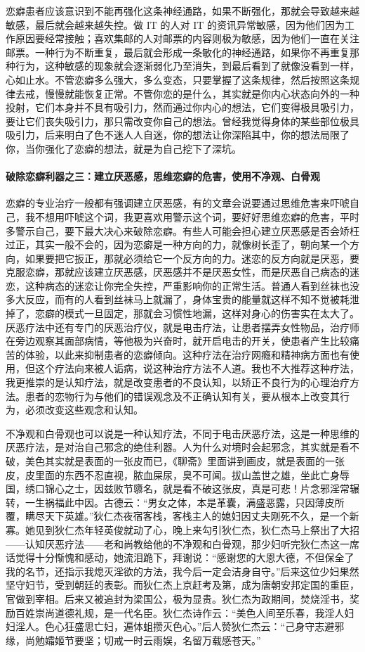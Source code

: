 恋癖患者应该意识到不能再强化这条神经通路，如果不断强化，那就会导致越来越敏感，最后就会越来越失控。做 IT 的人对 IT 的资讯异常敏感，因为他们因为工作原因要经常接触；喜欢集邮的人对邮票的内容则极为敏感，因为他们一直在关注邮票。一种行为不断重复，最后就会形成一条敏化的神经通路，如果你不再重复那种行为，这种敏感的现象就会逐渐弱化乃至消失，到最后看到了就像没看到一样，心如止水。不管恋癖多么强大，多么变态，只要掌握了这条规律，然后按照这条规律去戒，慢慢就能恢复正常。不管你恋的是什么，其实就是你内心状态向外的一种投射，它们本身并不具有吸引力，然而通过你内心的想法，它们变得极具吸引力，要让它们丧失吸引力，那只需改变你自己的想法。曾经我觉得身体的某些部位极具吸引力，后来明白了色不迷人人自迷，你的想法让你深陷其中，你的想法局限了你，当你强化了恋癖的想法，就是为自己挖下了深坑。

\paragraph{破除恋癖利器之三：建立厌恶感，思维恋癖的危害，使用不净观、白骨观}

恋癖的专业治疗一般都有强调建立厌恶感，有的文章会说要通过思维危害来吓唬自己，我不想用吓唬这个词，我更喜欢用警示这个词，要好好思维恋癖的危害，平时多警示自己，要下最大决心来破除恋癖。有些人可能会担心建立厌恶感是否会矫枉过正，其实一般不会的，因为恋癖是一种方向的力，就像树长歪了，朝向某一个方向，如果要把它扳正，那就必须给它一个反方向的力。迷恋的反方向就是厌恶，要克服恋癖，那就应该建立厌恶感，厌恶感并不是厌恶女性，而是厌恶自己病态的迷恋，这种病态的迷恋让你完全失控，严重影响你的正常生活。普通人看到丝袜也没多大反应，而有的人看到丝袜马上就漏了，身体宝贵的能量就这样不知不觉被耗泄掉了，恋癖的模式一旦固定，那就会习惯性地漏，这样对身心的伤害实在太大了。厌恶疗法中还有专门的厌恶治疗仪，就是电击疗法，让患者摆弄女性物品，治疗师在旁边观察其面部病情，等他极为兴奋时，就开启电击的开关，使患者产生比较痛苦的体验，以此来抑制患者的恋癖倾向。这种疗法在治疗网瘾和精神病方面也有使用，但这个疗法向来被人诟病，说这种治疗方法不人道。我也不大推荐这种疗法，我更推崇的是认知疗法，就是改变患者的不良认知，以矫正不良行为的心理治疗方法。患者的恋物行为与他们的错误观念及不正确认知有关，要从根本上改变其行为，必须改变这些观念和认知。

不净观和白骨观也可以说是一种认知疗法，不同于电击厌恶疗法，这是一种思维的厌恶疗法，是对治自己邪念的绝佳利器。人为什么对境时会起邪念，其实就是看不破，美色其实就是表面的一张皮而已，《聊斋》里面讲到画皮，就是表面的一张皮，皮里面的东西不忍直视，脓血屎尿，臭不可闻。拔山盖世之雄，坐此亡身辱国，绣口锦心之士，因兹败节隳名，就是看不破这张皮，真是可悲！片念邪淫常辗转，一生祸福此中因。古德云：“男女之体，本是革囊，满盛恶露，只因薄皮所覆，瞒尽天下英雄。”狄仁杰夜宿客栈，客栈主人的媳妇因丈夫刚死不久，是一个新寡。她见到狄仁杰年轻英俊就动了心，晚上来勾引狄仁杰，狄仁杰马上祭出了大招——认知厌恶疗法——老和尚教给他的不净观和白骨观，那少妇听完狄仁杰这一席话觉得十分惭愧和感动，她流泪跪下，拜谢说：“感谢您的大恩大德，不但保全了我的名节，还指示我熄灭淫欲的方法，我今后一定会洁身自守。”后来这位少妇果然坚守妇节，受到朝廷的表彰。而狄仁杰上京赶考及第，成为唐朝安邦定国的重臣，官做到宰相。后来又被追封为梁国公，极为显贵。狄仁杰为政期间，焚烧淫书，奖励百姓崇尚道德礼规，是一代名臣。狄仁杰诗作云：“美色人间至乐春，我淫人妇妇淫人。色心狂盛思亡妇，遍体蛆攒灭色心。”后人赞狄仁杰云：“己身守志避邪缘，尚勉孀姬节要坚；切戒一时云雨娱，名留万载感苍天。”

